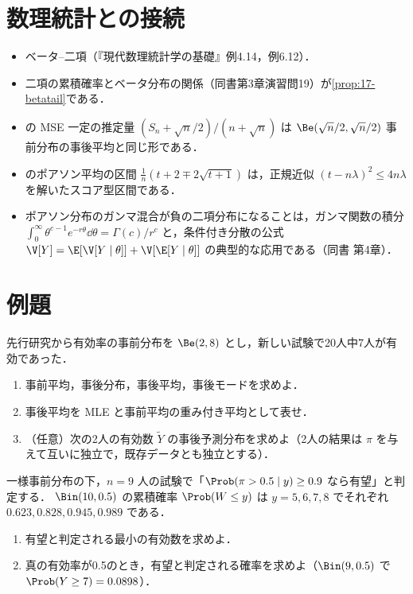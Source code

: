 \section{数理統計との接続}\label{sec:17-link}
\begin{linkbox}
\begin{itemize}
\item ベータ--二項（『現代数理統計学の基礎』例4.14，例6.12）．
\item 二項の累積確率とベータ分布の関係（同書第3章演習問19）が\cref{prop:17-betatail}である．
\item {} の MSE 一定の推定量 $(S_n+\sqrt n/2)/(n+\sqrt n)$ は $\Be(\sqrt n/2,\sqrt n/2)$ 事前分布の事後平均と同じ形である．
\item {} のポアソン平均の区間 $\frac1n(t+2\mp2\sqrt{t+1})$ は，正規近似 $(t-n\lambda)^2\le4n\lambda$ を解いたスコア型区間である．
\item ポアソン分布のガンマ混合が負の二項分布になることは，ガンマ関数の積分 $\int_0^\infty\theta^{c-1}e^{-r\theta}\dd\theta=\Gamma(c)/r^c$ と，条件付き分散の公式 $\V[Y]=\E[\V[Y\mid\theta]]+\V[\E[Y\mid\theta]]$ の典型的な応用である（同書 第4章）．
\end{itemize}
\end{linkbox}

\section{例題}\label{sec:17-ex}
\begin{reidai}\label{reidai:17-1}
先行研究から有効率の事前分布を $\Be(2,8)$ とし，新しい試験で20人中7人が有効であった．
\begin{enumerate}[label=(\arabic*)]
\item 事前平均，事後分布，事後平均，事後モードを求めよ．
\item 事後平均を MLE と事前平均の重み付き平均として表せ．
\item （任意）次の2人の有効数 $\tilde Y$ の事後予測分布を求めよ（2人の結果は $\pi$ を与えて互いに独立で，既存データとも独立とする）．
\end{enumerate}
\end{reidai}

\begin{reidai}[事後確率による判定]\label{reidai:17-2}
一様事前分布の下，$n=9$ 人の試験で「$\Prob(\pi>0.5\mid y)\ge0.9$ なら有望」と判定する．
$\Bin(10,0.5)$ の累積確率 $\Prob(W\le y)$ は $y=5,6,7,8$ でそれぞれ $0.623,0.828,0.945,0.989$ である．
\begin{enumerate}[label=(\arabic*)]
\item 有望と判定される最小の有効数を求めよ．
\item 真の有効率が0.5のとき，有望と判定される確率を求めよ（$\Bin(9,0.5)$ で $\Prob(Y\ge7)=0.0898$）．
\end{enumerate}
\end{reidai}

